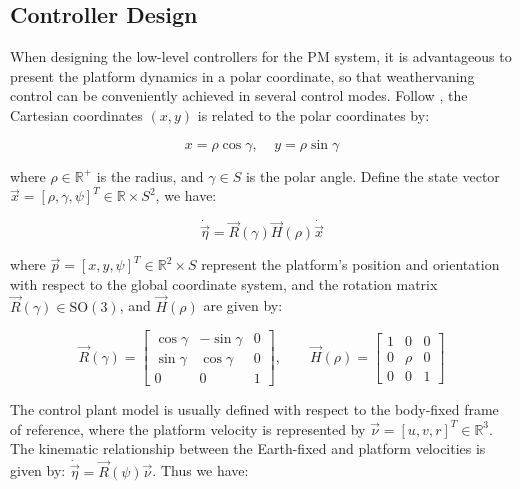 \begin{sloppypar}
\subsection{Controller Design}

When designing the low-level controllers for the PM system, it is advantageous to present the platform dynamics in a polar coordinate, so that weathervaning control can be conveniently achieved in several control modes. Follow \cite{fossen2001nonlinear}, the Cartesian coordinates $(x, y)$ is related to the polar coordinates by:

\begin{equation}
x = \rho\cos \gamma,\;\;\;\; y = \rho\sin \gamma
\end{equation}

\noindent where $\rho \in \mathbb{R}^+$ is the radius, and $\gamma \in S$ is the polar angle. Define the state vector $\vec{x} = [\rho, \gamma, \psi]^T \in \mathbb{R} \times S^2$, we have:

\begin{equation}
\dot{\vec{\eta}} = \vec{R}(\gamma)\vec{H}(\rho)\dot{\vec{x}}
\end{equation}

\noindent where $\vec{p} = [x, y, \psi]^T \in \mathbb{R}^2\times S$ represent the platform's position and orientation with respect to the global coordinate system, and the rotation matrix $\vec{R}(\gamma) \in \mathrm{SO}(3)$, and $\vec{H}(\rho)$ are given by:

\begin{equation}
\vec{R}(\gamma) = \begin{bmatrix}
\cos \gamma & -\sin \gamma & 0 \\
\sin \gamma & \cos \gamma & 0 \\
0 & 0 & 1
\end{bmatrix}, \qquad
\vec{H}(\rho) = \begin{bmatrix}
1 & 0 & 0 \\
0 & \rho & 0 \\
0 & 0 & 1
\end{bmatrix}
\end{equation}

The control plant model is usually defined with respect to the body-fixed frame of reference, where the platform velocity is represented by $\vec{\nu} = [u, v, r]^T \in \mathbb{R}^3$. The kinematic relationship between the Earth-fixed and platform velocities is given by: $\dot{\vec{\eta}} = \vec{R}(\psi)\vec{\nu}$. Thus we have:


\end{sloppypar}

